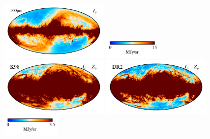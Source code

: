 \documentclass[twocolumn]{aa}
\begin{document}
\begin{figure}
    \centering
    \includegraphics[height=2.90cm]{figs/compare_zsma/cosmoglobe_ma_08.pdf}%
    \includegraphics[width=2.90cm,angle=90]{figs/compare_zsma/cbar_tot_08.pdf}%
    \includegraphics[height=2.90cm]{figs/compare_zsma/dirbe_zsma_08.pdf}%
    \includegraphics[height=2.90cm]{figs/compare_zsma/cosmoglobe_zsma_08.pdf}%
    \includegraphics[width=2.90cm,angle=90]{figs/compare_zsma/cbar_08.pdf}%
    \\


\end{figure}
\end{document}
